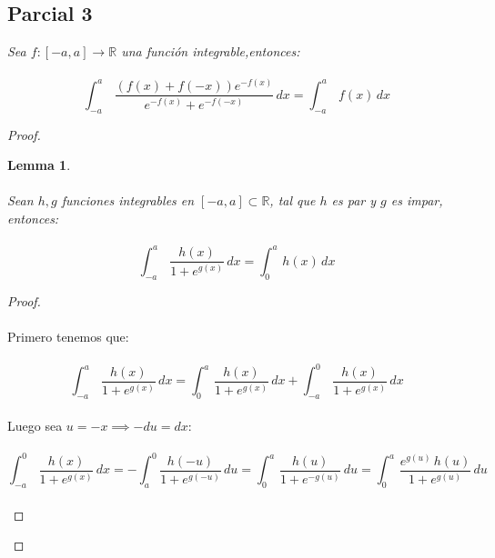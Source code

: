 \documentclass[11pt,letterpaper]{article}
\newtheorem{lemma}[theorem]{Lemma}
\newcommand{\R}{\mathbb{R}}
\begin{document}
\subsection*{Parcial 3}
\begin{tcolorbox}[
	title = \textcolor{black}{\textcolor{white}{Parcial 3}},]
\textit{Sea $f:[-a,a]\rightarrow \R$ una funci\'on integrable,entonces:\,\\
\,\\
\begin{equation*}
    \int_{-a}^{a}\,\frac{(f(x)+f(-x))e^{-f(x)}}{e^{-f(x)}+e^{-f(-x)}}\,dx=\int_{-a}^{a}\,f(x)\,dx
\end{equation*}}
\end{tcolorbox}
\begin{proof}
    \begin{lemma}\,\\
        \,\\
        Sean $h,g$ funciones integrables en $[-a,a]\subset \R$, tal que $h$ es par y $g$ es impar, entonces:\,\\
        \,\\
        \begin{equation*}
            \int_{-a}^{a}\,\frac{h(x)}{1+e^{g(x)}}\,dx=\int_{0}^{a}\,h(x)\,dx
        \end{equation*}
    \end{lemma}
    \begin{proof}\,\\
        \,\\
        Primero tenemos que:\,\\
        \,\\
        \begin{equation*}
            \int_{-a}^{a}\,\frac{h(x)}{1+e^{g(x)}}\,dx=\int_{0}^{a}\,\frac{h(x)}{1+e^{g(x)}}\,dx+\int_{-a}^{0}\,\frac{h(x)}{1+e^{g(x)}}\,dx
        \end{equation*}\,\\
        Luego sea $u=-x\implies -du=dx$:\,\\
        \,\\
        \begin{equation*}
            \int_{-a}^{0}\,\frac{h(x)}{1+e^{g(x)}}\,dx=-\int_{a}^{0}\frac{h(-u)}{1+e^{g(-u)}}\,du=\int_{0}^{a}\,\frac{h(u)}{1+e^{-g(u)}}\,du=\int_{0}^{a}\,\frac{e^{g(u)}\,h(u)}{1+e^{g(u)}}\,du
        \end{equation*}\,\\
        

\end{proof}
\end{proof}
\end{document}

